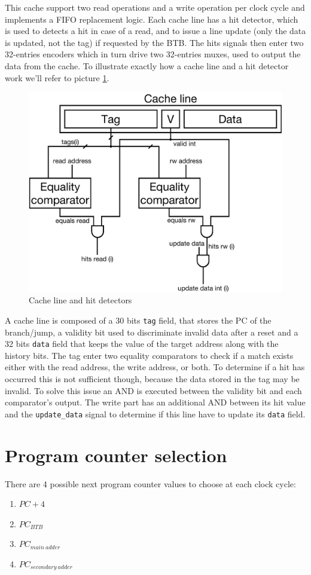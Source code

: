 This cache support two read operations and a write operation per clock cycle and implements a FIFO replacement logic. Each cache line has a hit detector, which is used to detects a hit in case of a read, and
to issue a line update (only the data is updated, not the tag) if requested by the BTB. The hits signals then enter two 32-entries encoders which in turn drive two 32-entries muxes, used to output the data from the cache.
To illustrate exactly how a cache line and a hit detector work we'll refer to picture \ref{fig:BTB_cache_line}.

\begin{figure}[!ht]
	\centering
	\includegraphics[width=0.6\linewidth]{./chapters/figures/BTB_cache_line.pdf}
    \caption{Cache line and hit detectors}
    \label{fig:BTB_cache_line}
\end{figure}

A cache line is composed of a 30 bits \verb|tag| field, that stores the PC of the branch/jump, a validity bit used to discriminate invalid data after a reset and a 32 bits \verb|data| field that keeps the value
of the target address along with the history bits. The tag enter two equality comparators to check if a match exists either with the read address, the write address, or both. To determine if a hit has occurred this
is not sufficient though, because the data stored in the tag may be invalid. To solve this issue an AND is executed between the validity bit and each comparator's output. The write part has an additional AND between
its hit value and the \verb|update_data| signal to determine if this line have to update its \verb|data| field.

\section{Program counter selection}
\label{sec:pc_selection}

There are 4 possible next program counter values to choose at each clock cycle:
\begin{enumerate}
    \item $PC + 4$
    \item $PC_{BTB}$
    \item $PC_{main\ adder}$
    \item $PC_{secondary\ adder}$
\end{enumerate}


